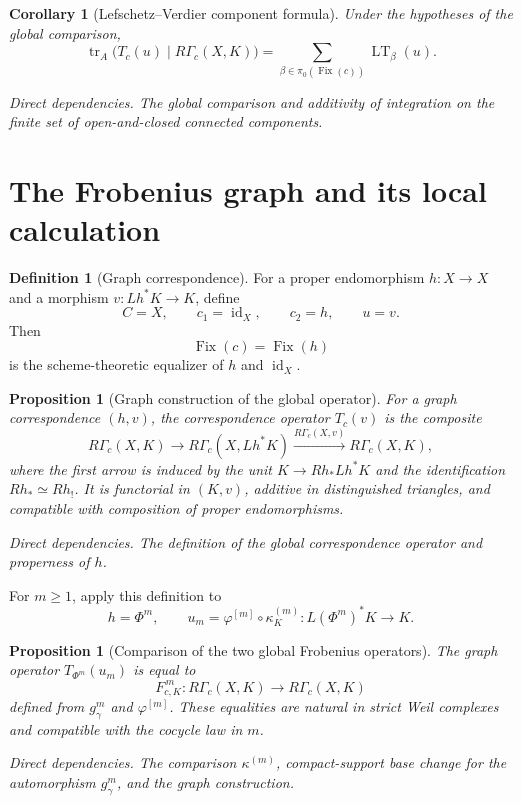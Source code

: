 \documentclass[10pt]{article}
\newtheorem{proposition}[theorem]{Proposition}
\newtheorem{corollary}[theorem]{Corollary}
\theoremstyle{definition}
\newtheorem{definition}[theorem]{Definition}
\newcommand{\Fix}{\operatorname{Fix}}
\newcommand{\RGammac}{R\Gamma_c}
\newcommand{\depends}[1]{\par\smallskip\noindent\textit{Direct dependencies.} #1\par}
\begin{document}
\begin{corollary}[Lefschetz--Verdier component formula]
Under the hypotheses of the global comparison,
\[
 \operatorname{tr}_A
 \bigl(T_c(u)\mid\RGammac(X,K)\bigr)
 =
 \sum_{\beta\in\pi_0(\Fix(c))}
 \operatorname{LT}_\beta(u).
\]
\depends{The global comparison and additivity of integration on the finite
set of open-and-closed connected components.}
\end{corollary}

\section{The Frobenius graph and its local calculation}

\begin{definition}[Graph correspondence]
For a proper endomorphism \(h:X\to X\) and a morphism
\(v:Lh^*K\to K\), define
\[
 C=X,\qquad c_1=\operatorname{id}_X,\qquad c_2=h,\qquad u=v.
\]
Then
\[
 \Fix(c)=\Fix(h)
\]
is the scheme-theoretic equalizer of \(h\) and \(\operatorname{id}_X\).
\end{definition}

\begin{proposition}[Graph construction of the global operator]
For a graph correspondence \((h,v)\), the correspondence operator
\(T_c(v)\) is the composite
\[
 \RGammac(X,K)\longrightarrow\RGammac(X,Lh^*K)
 \xrightarrow{\RGammac(X,v)}\RGammac(X,K),
\]
where the first arrow is induced by the unit
\(K\to Rh_*Lh^*K\) and the identification \(Rh_*\simeq Rh_!\).
It is functorial in \((K,v)\), additive in distinguished triangles, and
compatible with composition of proper endomorphisms.
\depends{The definition of the global correspondence operator and
properness of \(h\).}
\end{proposition}

For \(m\geq1\), apply this definition to
\[
 h=\Phi^m,\qquad
 u_m=\varphi^{[m]}\circ\kappa_K^{(m)}:
 L(\Phi^m)^*K\longrightarrow K.
\]

\begin{proposition}[Comparison of the two global Frobenius operators]
The graph operator \(T_{\Phi^m}(u_m)\) is equal to
\[
 F_{c,K}^{\,m}:\RGammac(X,K)\to\RGammac(X,K)
\]
defined from \(g_\gamma^m\) and \(\varphi^{[m]}\).  These equalities are
natural in strict Weil complexes and compatible with the cocycle law in
\(m\).
\depends{The comparison \(\kappa^{(m)}\), compact-support base change for
the automorphism \(g_\gamma^m\), and the graph construction.}
\end{proposition}
\end{document}

